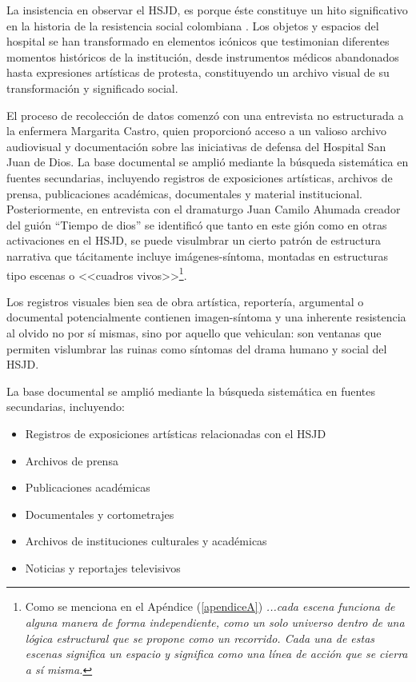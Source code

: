 La insistencia en observar el HSJD, es porque éste constituye un hito significativo en la historia de la resistencia social colombiana \parencite{Gongora2013}. Los objetos y espacios del hospital se han transformado en elementos icónicos que testimonian diferentes momentos históricos de la institución, desde instrumentos médicos abandonados hasta expresiones artísticas de protesta, constituyendo un archivo visual de su transformación y significado social.

El proceso de recolección de datos comenzó con una entrevista no estructurada a la enfermera Margarita Castro, quien proporcionó acceso a un valioso archivo audiovisual y documentación sobre las iniciativas de defensa del Hospital San Juan de Dios. La base documental se amplió mediante la búsqueda sistemática en fuentes secundarias, incluyendo registros de exposiciones artísticas, archivos de prensa, publicaciones académicas, documentales y material institucional. Posteriormente, en entrevista con el dramaturgo Juan Camilo Ahumada creador del guión ``Tiempo de dios'' se identificó que tanto en este gión como en otras activaciones en el HSJD, se puede visulmbrar un cierto patrón de estructura narrativa que tácitamente incluye imágenes-síntoma, montadas en estructuras tipo escenas o <<cuadros vivos>>\footnote{Como se menciona en el Apéndice (\ref{apendiceA}) \textit{...cada escena funciona de alguna manera de forma independiente, como un solo universo dentro de una lógica estructural que se propone como un recorrido. Cada una de estas escenas significa un espacio y  significa como una línea de acción que se cierra a sí misma.}}.

Los registros visuales bien sea de obra artística, reportería, argumental o documental potencialmente contienen imagen-síntoma y una inherente resistencia al olvido no por sí mismas, sino por aquello que vehiculan: son ventanas que permiten vislumbrar las ruinas como síntomas del drama humano y social del HSJD.

La base documental se amplió mediante la búsqueda sistemática en fuentes secundarias, incluyendo:

\begin{itemize}
\item Registros de exposiciones artísticas relacionadas con el HSJD
\item Archivos de prensa
\item Publicaciones académicas
\item Documentales y cortometrajes
\item Archivos de instituciones culturales y académicas
\item Noticias y reportajes televisivos
\end{itemize}

